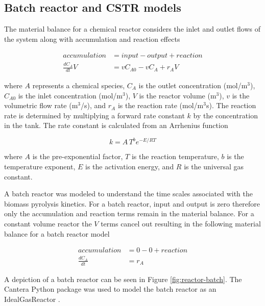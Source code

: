 \subsection{Batch reactor and CSTR models}

The material balance for a chemical reactor considers the inlet and outlet flows of the system along with accumulation and reaction effects

\begin{equation}
    \begin{aligned}
        accumulation &= input - output + reaction \\
        \frac{dC_A}{dt} V &= v C_{A0} - v C_A + r_A V
    \end{aligned}
\end{equation}

\noindent where $A$ represents a chemical species, $C_A$ is the outlet concentration (mol/m$^3$), $C_{A0}$ is the inlet concentration (mol/m$^3$), $V$ is the reactor volume (m$^3$), $v$ is the volumetric flow rate (m$^3$/s), and $r_A$ is the reaction rate (mol/m$^3$s). The reaction rate is determined by multiplying a forward rate constant $k$ by the concentration in the tank. The rate constant is calculated from an Arrhenius function

\begin{equation}
    \label{eq:rate-constant}
    k = A\,T^b e^{-E / RT}
\end{equation}

\noindent where $A$ is the pre-exponential factor, $T$ is the reaction temperature, $b$ is the temperature exponent, $E$ is the activation energy, and $R$ is the universal gas constant.

A batch reactor was modeled to understand the time scales associated with the biomass pyrolysis kinetics. For a batch reactor, input and output is zero therefore only the accumulation and reaction terms remain in the material balance. For a constant volume reactor the $V$ terms cancel out resulting in the following material balance for a batch reactor model

\begin{equation}
    \label{eq:batch-balance}
    \begin{aligned}
        accumulation &= 0 - 0 + reaction \\
        \frac{dC_A}{dt} &= r_A
    \end{aligned}
\end{equation}

\noindent A depiction of a batch reactor can be seen in Figure \ref{fig:reactor-batch}. The Cantera Python package was used to model the batch reactor as an IdealGasReactor \cite{Cantera-2018}.

